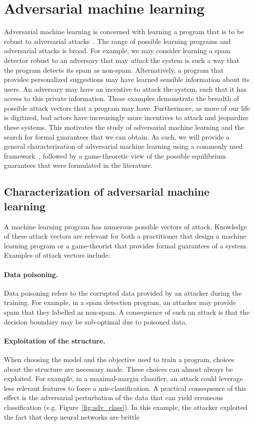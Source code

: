 \section{Adversarial machine learning}
\label{sec-review}

Adversarial machine learning is concerned with learning a program that is to be robust to adversarial attacks~\cite{aml_book}. The range of possible learning programs and adversarial attacks is broad. For example, we may consider learning a spam detector robust to an adversary that may \textit{attack} the system is such a way that the program detects its spam as non-spam. Alternatively, a program that provides personalized suggestions may have learned sensible information about its users. An adversary may have an incentive to attack the system, such that it has access to this private information. These examples demonstrate the breadth of possible attack vectors that a program may have. Furthermore, as more of our life is digitized, bad actors have increasingly more incentives to attack and jeopardize these systems. This motivates the study of adversarial machine learning and the search for formal guarantees that we can obtain. As such, we will provide a general characterization of adversarial machine learning using a commonly used framework~\cite{aml_book}, followed by a game-theoretic view of the possible equilibrium guarantees that were formulated in the literature.

\subsection{Characterization of adversarial machine learning}
A machine learning program has numerous possible vectors of attack. Knowledge of these attack vectors are relevant for both a practitioner that design a machine learning program or a game-theorist that provides formal guarantees of a system. Examples of attack vectors include:
\paragraph{Data poisoning.} Data poisoning refers to the corrupted data provided by an attacker during the training. For example, in a spam detection program, an attacker may provide spam that they labelled as non-spam. A consequence of such an attack is that the decision boundary may be sub-optimal due to poisoned data.
\paragraph{Exploitation of the structure.} When choosing the model and the objective used to train a program, choices about the structure are necessary made. These choices can almost always be exploited. For example, in a maximal-margin classifier, an attack could leverage less relevant features to force a mis-classification. A practical consequence of this effect is the adversarial perturbation of the data that can yield erroneous classification (e.g. Figure~\ref{fig:adv_class}). In this example, the attacker exploited the fact that deep neural networks are brittle
